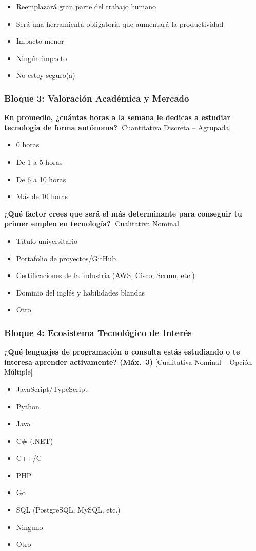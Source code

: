 \begin{itemize}
    \item Reemplazará gran parte del trabajo humano
    \item Será una herramienta obligatoria que aumentará la productividad
    \item Impacto menor
    \item Ningún impacto
    \item No estoy seguro(a)
\end{itemize}

\subsubsection*{Bloque 3: Valoración Académica y Mercado}

\textbf{En promedio, ¿cuántas horas a la semana le dedicas a estudiar tecnología de forma autónoma?} [Cuantitativa Discreta -- Agrupada]

\begin{itemize}
    \item 0 horas
    \item De 1 a 5 horas
    \item De 6 a 10 horas
    \item Más de 10 horas
\end{itemize}

\textbf{¿Qué factor crees que será el más determinante para conseguir tu primer empleo en tecnología?} [Cualitativa Nominal]

\begin{itemize}
    \item Título universitario
    \item Portafolio de proyectos/GitHub
    \item Certificaciones de la industria (AWS, Cisco, Scrum, etc.)
    \item Dominio del inglés y habilidades blandas
    \item Otro
\end{itemize}

\subsubsection*{Bloque 4: Ecosistema Tecnológico de Interés}

\textbf{¿Qué lenguajes de programación o consulta estás estudiando o te interesa aprender activamente? (Máx.~3)} [Cualitativa Nominal -- Opción Múltiple]

\begin{itemize}
    \item JavaScript/TypeScript
    \item Python
    \item Java
    \item C\# (.NET)
    \item C++/C
    \item PHP
    \item Go
    \item SQL (PostgreSQL, MySQL, etc.)
    \item Ninguno
    \item Otro
\end{itemize}

